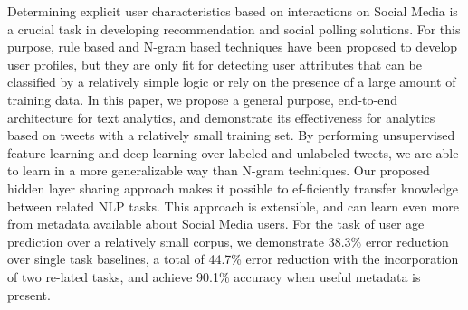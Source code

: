 Determining explicit user characteristics based on interactions on Social Media is a crucial task in developing recommendation and social polling solutions. For this purpose, rule based and N-gram based techniques have been proposed to develop user profiles, but they are only fit for detecting user attributes that can be classified by a relatively simple logic or rely on the presence of a large amount of training data. In this paper, we propose a general purpose, end-to-end architecture for text analytics, and demonstrate its effectiveness for analytics based on tweets with a relatively small training set. By performing unsupervised feature learning and deep learning over labeled and unlabeled tweets, we are able to learn in a more generalizable way than N-gram techniques. Our proposed hidden layer sharing approach makes it possible to ef-ficiently transfer knowledge between related NLP tasks. This approach is extensible, and can learn even more from metadata available about Social Media users. For the task of user age prediction over a relatively small corpus, we demonstrate 38.3\% error reduction over single task baselines, a total of 44.7\% error reduction with the incorporation of two re-lated tasks, and achieve 90.1\% accuracy when useful metadata is present.

